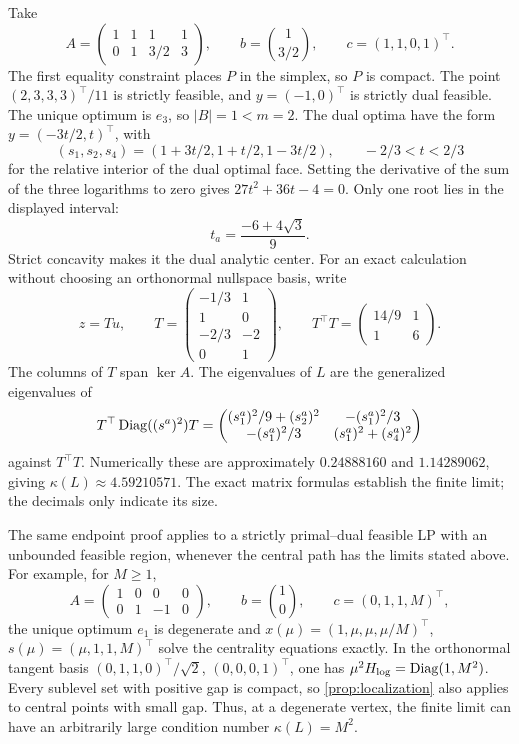\begin{example}
\label{ex:degenerate-lp}
Take
\begin{equation}
 A=\begin{pmatrix}1&1&1&1\\0&1&3/2&3\end{pmatrix},\qquad
 b=\binom{1}{3/2},\qquad c=(1,1,0,1)^\top.
 \label{eq:degenerate-lp-data}
\end{equation}
The first equality constraint places $P$ in the simplex, so $P$ is
compact. The point
$(2,3,3,3)^\top/11$ is strictly feasible, and $y=(-1,0)^\top$
is strictly dual feasible. The unique optimum is $e_3$, so
$|B|=1<m=2$. The dual optima have the form $y=(-3t/2,t)^\top$, with
\[
 (s_1,s_2,s_4)=(1+3t/2,1+t/2,1-3t/2),\qquad -2/3<t<2/3
\]
for the relative interior of the dual optimal face.
Setting the derivative of the sum of the three logarithms to zero gives
$27t^2+36t-4=0$. Only one root lies in the displayed interval:
\begin{equation}
 t_a=\frac{-6+4\sqrt3}{9}.
 \label{eq:degenerate-lp-center}
\end{equation}
Strict concavity makes it the dual analytic center. For an exact
calculation without choosing an orthonormal nullspace basis, write
\[
 z=Tu,\qquad
 T=\begin{pmatrix}-1/3&1\\1&0\\-2/3&-2\\0&1\end{pmatrix},
 \qquad T^\top T=\begin{pmatrix}14/9&1\\1&6\end{pmatrix}.
\]
The columns of $T$ span $\ker A$. The eigenvalues of $L$ are the
generalized eigenvalues of
\[
 T^\top\operatorname{Diag}((s^a)^2)T
 =\begin{pmatrix}
 (s_1^a)^2/9+(s_2^a)^2&-(s_1^a)^2/3\\
 -(s_1^a)^2/3&(s_1^a)^2+(s_4^a)^2
 \end{pmatrix}
\]
against $T^\top T$. Numerically these are approximately
$0.24888160$ and $1.14289062$, giving $\kappa(L)\approx4.59210571$.
The exact matrix formulas establish the finite limit; the decimals
only indicate its size.
\end{example}

The same endpoint proof applies to a strictly primal--dual feasible LP
with an unbounded feasible region, whenever the central path has the
limits stated above. For example, for $M\geq1$,
\[
 A=\begin{pmatrix}1&0&0&0\\0&1&-1&0\end{pmatrix},\qquad
 b=\binom10,\qquad c=(0,1,1,M)^\top,
\]
the unique optimum $e_1$ is degenerate and
$x(\mu)=(1,\mu,\mu,\mu/M)^\top$,
$s(\mu)=(\mu,1,1,M)^\top$ solve the centrality equations exactly.
In the orthonormal tangent basis
$(0,1,1,0)^\top/\sqrt2$, $(0,0,0,1)^\top$, one has
$\mu^2H_{\log}=\operatorname{Diag}(1,M^2)$. Every sublevel set with positive gap is compact, so
\cref{prop:localization} also applies to central points with small gap.
Thus, at a degenerate vertex, the finite limit can have an arbitrarily
large condition number $\kappa(L)=M^2$.
